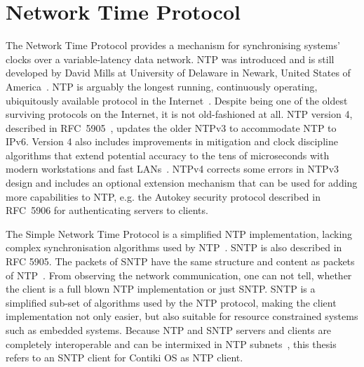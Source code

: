 
\chapter{Network Time Protocol}
The Network Time Protocol provides a mechanism for synchronising systems' clocks over a variable-latency data network.
NTP was introduced and is still developed by
David Mills at University of Delaware in Newark, United States of America~\cite{ntp-history}.
NTP is arguably the longest running, continuously operating,
ubiquitously available protocol in the Internet~\cite{ntp-overview}.
Despite being one of the oldest surviving protocols on the Internet, it is not old-fashioned at all.
NTP version 4, described in RFC~5905~\cite{rfc5905}, updates the older NTPv3 to accommodate NTP to IPv6.
Version 4 also includes improvements in
mitigation and clock discipline algorithms that extend
potential accuracy to the tens of microseconds with modern
workstations and fast LANs~\cite{rfc5905}.
NTPv4 corrects some
errors in NTPv3 design and includes an optional extension mechanism
that can be used for adding more capabilities to NTP, e.g. the
Autokey security protocol described in RFC~5906
for authenticating servers to clients.

The Simple Network Time Protocol is a simplified NTP implementation, lacking complex
synchronisation algorithms used by NTP~\cite{rfc5905}.
SNTP is also described in RFC 5905.
The packets of SNTP have the same structure and content as packets of NTP~\cite{rfc5905}.
From observing the network communication, one can not tell, whether the client
is a full blown NTP implementation or just SNTP.
SNTP is a simplified sub-set of algorithms used by the NTP protocol,
making the client implementation not only easier, but also suitable for
resource constrained systems such as embedded systems.
Because NTP and SNTP servers and clients are
completely interoperable and can be intermixed in NTP subnets~\cite{rfc5905},
this thesis refers to an SNTP client for Contiki OS as NTP client.









